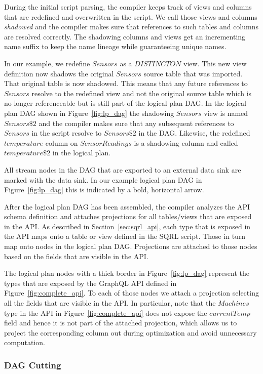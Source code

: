 \documentclass[	DIV=calc,%
							paper=letter,%
							fontsize=11pt,%
							twocolumn]{scrartcl}	 					%
\begin{document}
During the initial script parsing, the compiler keeps track of views and columns that are redefined and overwritten in the script. We call those views and columns \emph{shadowed} and the compiler makes sure that references to such tables and columns are resolved correctly. The shadowing columns and views get an incrementing name suffix to keep the name lineage while guaranteeing unique names.

In our example, we redefine $Sensors$ as a $DISTINCT ON$ view. This new view definition now shadows the original $Sensors$ source table that was imported. That original table is now shadowed. This means that any future references to $Sensors$ resolve to the redefined view and not the original source table which is no longer referenceable but is still part of the logical plan DAG. In the logical plan DAG shown in Figure~\ref{fig:lp_dag} the shadowing $Sensors$ view is named $Sensors\$2$ and the compiler makes sure that any subsequent references to $Sensors$ in the script resolve to $Sensors\$2$ in the DAG.
Likewise, the redefined $temperature$ column on $SensorReadings$ is a shadowing column and called $temperature\$2$ in the logical plan.

All stream nodes in the DAG that are exported to an external data sink are marked with the data sink. In our example logical plan DAG in Figure~\ref{fig:lp_dag} this is indicated by a bold, horizontal arrow.

After the logical plan DAG has been assembled, the compiler analyzes the API schema definition and attaches projections for all tables/views that are exposed in the API. As described in Section~\ref{sec:sqrl_api}, each type that is exposed in the API maps onto a table or view defined in the SQRL script. Those in turn map onto nodes in the logical plan DAG. Projections are attached to those nodes based on the fields that are visible in the API.

The logical plan nodes with a thick border in Figure~\ref{fig:lp_dag} represent the types that are exposed by the GraphQL API defined in Figure~\ref{fig:complete_api}. To each of those nodes we attach a projection selecting all the fields that are visible in the API. In particular, note that the $Machines$ type in the API in Figure~\ref{fig:complete_api} does not expose the $currentTemp$ field and hence it is not part of the attached projection, which allows us to project the corresponding column out during optimization and avoid unnecessary computation.

\subsubsection{DAG Cutting}
\end{document}
